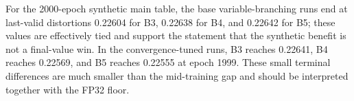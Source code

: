 For the 2000-epoch synthetic main table, the base variable-branching runs end at last-valid distortions 0.22604 for B3, 0.22638 for B4, and 0.22642 for B5; these values are effectively tied and support the statement that the synthetic benefit is not a final-value win. In the convergence-tuned runs, B3 reaches 0.22641, B4 reaches 0.22569, and B5 reaches 0.22555 at epoch 1999. These small terminal differences are much smaller than the mid-training gap and should be interpreted together with the FP32 floor.
